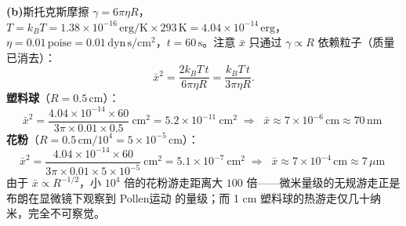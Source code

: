 \textbf{(b)}斯托克斯摩擦 $\gamma=6\pi\eta R$，$T=k_BT=1.38\times10^{-16}\,\mathrm{erg/K}\times293\,\mathrm K=4.04\times10^{-14}\,\mathrm{erg}$，$\eta=0.01\,\mathrm{poise}=0.01\,\mathrm{dyn\,s/cm^2}$，$t=60\,\mathrm s$。注意 $\bar x$ 只通过 $\gamma\propto R$ 依赖粒子（质量已消去）：
\begin{equation*}
\bar x^2=\frac{2k_BT\,t}{6\pi\eta R}=\frac{k_BT\,t}{3\pi\eta R}.
\end{equation*}
\textbf{塑料球}（$R=0.5\,\mathrm{cm}$）：
\begin{equation*}
\bar x^2=\frac{4.04\times10^{-14}\times60}{3\pi\times0.01\times0.5}\ \mathrm{cm}^2
=5.2\times10^{-11}\ \mathrm{cm}^2
\;\Longrightarrow\;
\boxed{\;\bar x\approx7\times10^{-6}\,\mathrm{cm}\approx70\,\mathrm{nm}\;}
\end{equation*}
\textbf{花粉}（$R=0.5\,\mathrm{cm}/10^4=5\times10^{-5}\,\mathrm{cm}$）：
\begin{equation*}
\bar x^2=\frac{4.04\times10^{-14}\times60}{3\pi\times0.01\times5\times10^{-5}}\ \mathrm{cm}^2
=5.1\times10^{-7}\ \mathrm{cm}^2
\;\Longrightarrow\;
\boxed{\;\bar x\approx7\times10^{-4}\,\mathrm{cm}\approx7\,\mu\mathrm{m}\;}
\end{equation*}
由于 $\bar x\propto R^{-1/2}$，小 $10^4$ 倍的花粉游走距离大 $100$ 倍——微米量级的无规游走正是布朗在显微镜下观察到 Pollen运动 的量级；而 1 cm 塑料球的热游走仅几十纳米，完全不可察觉。

